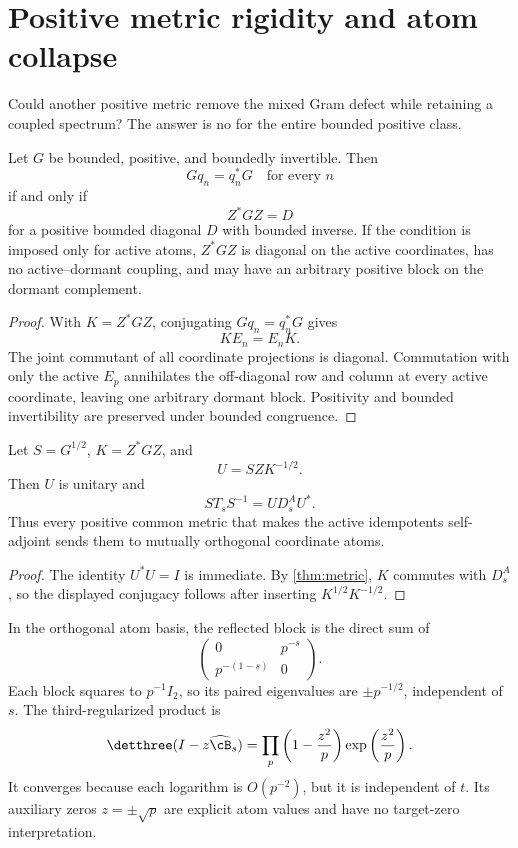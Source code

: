 \section{Positive metric rigidity and atom collapse}
\label{sec:metric}

Could another positive metric remove the mixed Gram defect while
retaining a coupled spectrum?  The answer is no for the entire bounded
positive class.

\begin{theorem}
\label{thm:metric}
Let $G$ be bounded, positive, and boundedly invertible.
Then
\[
 Gq_n=q_n^*G\quad\text{for every }n
\]
if and only if
\[
 Z^*GZ=D
\]
for a positive bounded diagonal $D$ with bounded inverse.
If the condition is imposed only for active atoms, $Z^*GZ$ is diagonal
on the active coordinates, has no active--dormant coupling, and may
have an arbitrary positive block on the dormant complement.
\end{theorem}

\begin{proof}
With $K=Z^*GZ$, conjugating $Gq_n=q_n^*G$ gives
\[
 KE_n=E_nK.
\]
The joint commutant of all coordinate projections is diagonal.
Commutation with only the active $E_p$ annihilates the off-diagonal
row and column at every active coordinate, leaving one arbitrary
dormant block.  Positivity and bounded invertibility are preserved
under bounded congruence.
\end{proof}

\begin{corollary}
\label{cor:collapse}
Let $S=G^{1/2}$, $K=Z^*GZ$, and
\[
 U=SZK^{-1/2}.
\]
Then $U$ is unitary and
\[
 ST_sS^{-1}=UD_s^AU^*.
\]
Thus every positive common metric that makes the active idempotents
self-adjoint sends them to mutually orthogonal coordinate atoms.
\end{corollary}

\begin{proof}
The identity $U^*U=I$ is immediate.  By
\cref{thm:metric}, $K$ commutes with $D_s^A$, so the displayed
conjugacy follows after inserting $K^{1/2}K^{-1/2}$.
\end{proof}

In the orthogonal atom basis, the reflected block is the direct sum of
\[
 \begin{pmatrix}
 0&p^{-s}\\p^{-(1-s)}&0
 \end{pmatrix}.
\]
Each block squares to $p^{-1}I_2$, so its paired eigenvalues are
$\pm p^{-1/2}$, independent of $s$.  The third-regularized product is
\[
 \detthree(I-z\widehat{\cB}_s)
 =\prod_p\left(1-\frac{z^2}{p}\right)
 \exp\left(\frac{z^2}{p}\right).
\]
It converges because each logarithm is $O(p^{-2})$, but it is
independent of $t$.  Its auxiliary zeros $z=\pm\sqrt p$ are explicit
atom values and have no target-zero interpretation.

